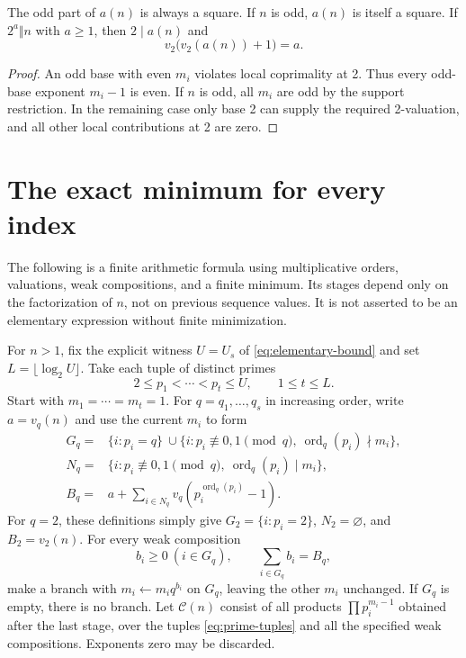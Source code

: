 \begin{corollary}\label{cor:square}
The odd part of $a(n)$ is always a square. If $n$ is odd, $a(n)$ is
itself a square. If $2^a\Vert n$ with $a\ge1$, then $2\mid a(n)$ and
\[
 v_2\bigl(v_2(a(n))+1\bigr)=a.
\]
\end{corollary}
\begin{proof}
An odd base with even $m_i$ violates local coprimality at 2. Thus every
odd-base exponent $m_i-1$ is even. If $n$ is odd, all $m_i$ are odd by
the support restriction. In the remaining case only base 2 can supply
the required 2-valuation, and all other local contributions at 2 are zero.
\end{proof}

\section{The exact minimum for every index}\label{sec:all-minima}
The following is a finite arithmetic formula using multiplicative orders,
valuations, weak compositions, and a finite minimum. Its stages depend
only on the factorization of $n$, not on previous sequence values. It is
not asserted to be an elementary expression without finite minimization.

For $n>1$, fix the explicit witness $U=U_s$ of
\eqref{eq:elementary-bound} and set $L=\lfloor\log_2 U\rfloor$.
Take each tuple of distinct primes
\begin{equation}\label{eq:prime-tuples}
 2\le p_1<\cdots<p_t\le U,\qquad 1\le t\le L.
\end{equation}
Start with $m_1=\cdots=m_t=1$. For $q=q_1,\ldots,q_s$ in increasing
order, write $a=v_q(n)$ and use the current $m_i$ to form
\begin{align*}
 G_q={}&\{i:p_i=q\}\ \cup
 \{i:p_i\not\equiv0,1\pmod q,\ \operatorname{ord}_q(p_i)\nmid m_i\},\\
 N_q={}&\{i:p_i\not\equiv0,1\pmod q,\ \operatorname{ord}_q(p_i)\mid m_i\},\\
 B_q={}&a+\sum_{i\in N_q}v_q(p_i^{\operatorname{ord}_q(p_i)}-1).
\end{align*}
For $q=2$, these definitions simply give $G_2=\{i:p_i=2\}$,
$N_2=\varnothing$, and $B_2=v_2(n)$.
For every weak composition
\begin{equation}\label{eq:allocations}
 b_i\ge0\ (i\in G_q),\qquad \sum_{i\in G_q}b_i=B_q,
\end{equation}
make a branch with $m_i\leftarrow m_iq^{b_i}$ on $G_q$, leaving the
other $m_i$ unchanged. If $G_q$ is empty, there is no branch.
Let $\mathcal C(n)$ consist of all products $\prod p_i^{m_i-1}$ obtained
after the last stage, over the tuples \eqref{eq:prime-tuples} and all
the specified weak compositions. Exponents zero may be discarded.

